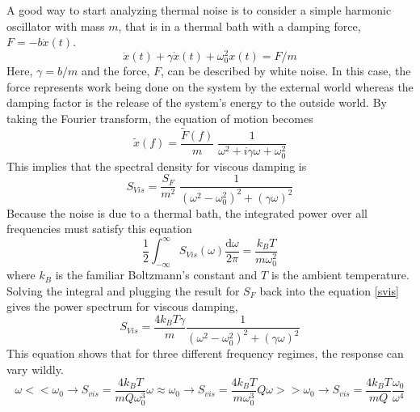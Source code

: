 		A good way to start analyzing thermal noise is to consider a simple harmonic oscillator with mass $m$, that is in a thermal bath with a damping force, $F=-b\dot{x}(t)$.
		\begin{equation}
		\ddot{x}(t) + \gamma \dot{x}(t) + \omega_{0}^2 x(t) = F/m
		\end{equation}
		Here, $\gamma = b/m$ and the force, $F$, can be described by white noise.  In this case, the force represents work being done on the system by the external world whereas the damping factor is the release of the system's energy to the outside world.  By taking the Fourier transform, the equation of motion becomes
		\begin{equation}\label{harmonic}
		\tilde{x}(f) = \frac{\tilde{F}(f)}{m} \; \frac{1}{\omega^2 +i \gamma \omega + \omega_{0}^2} 
		\end{equation}
		This implies that the spectral density for viscous damping is
		\begin{equation}\label{svis}
		S_{Vis} = \frac{S_F}{m^2} \; \frac{1}{(\omega^2 -\omega_{0}^2)^2 + (\gamma\omega)^2}
		\end{equation}
		Because the noise is due to a thermal bath, the integrated power over all frequencies must satisfy this equation
		\begin{equation}
		\frac{1}{2} \int_{-\infty}^{\infty} S_{Vis} (\omega) \frac{\text{d}\omega}{2\pi} = \frac{k_B T}{m\omega_{0}^2}
		\end{equation}
		where $k_B$ is the familiar Boltzmann's constant and $T$ is the ambient temperature.  Solving the integral and plugging the result for $S_F$ back into the equation \ref{svis} gives the power spectrum for viscous damping,
		\begin{equation}\label{vis}
		S_{Vis} = \frac{4k_B T \gamma}{m} \frac{1}{(\omega^2 - \omega_{0}^2)^2 + (\gamma\omega)^2}
		\end{equation}
		This equation shows that for three different frequency regimes, the response can vary wildly.
		\begin{subequations}
			\begin{equation}
			\omega<< \omega_{0} \rightarrow S_{vis} = \frac{4k_B T}{m Q \omega_{0}^3}
			\end{equation}
			\begin{equation}
			\omega \approx \omega_{0} \rightarrow S_{vis} = \frac{4k_B T}{m \omega_{0}^3} Q
			\end{equation}
			\begin{equation}
			\omega >> \omega_{0} \rightarrow S_{vis} = \frac{4k_B T}{m Q} \frac{\omega_0}{\omega^4} 
			\end{equation}
		\end{subequations}
